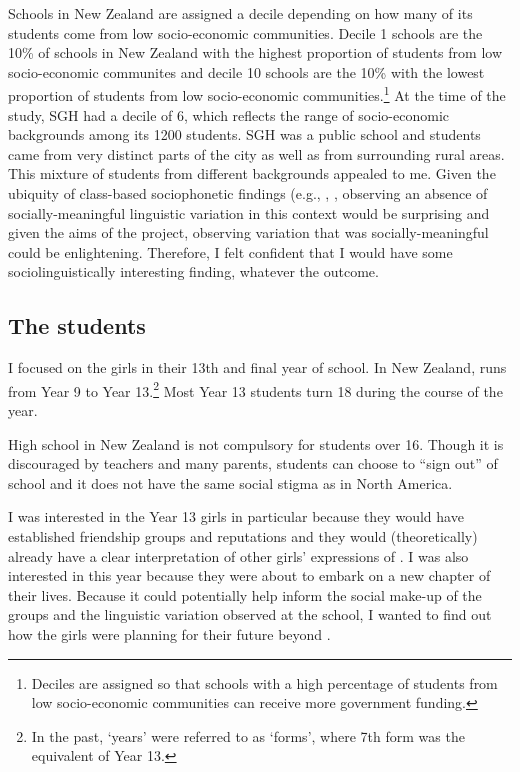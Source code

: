 Schools in New Zealand are assigned a decile depending on how many of its students come from low socio-economic communities. Decile 1 schools are the 10\% of schools in New Zealand with the highest proportion of students from low socio-economic communites and decile 10 schools are the 10\% with the lowest proportion of students from low socio-economic communities.\footnote{Deciles are assigned so that schools with a high percentage of students from low socio-economic communities can receive more government funding.} At the time of the study, SGH had a decile of 6, which reflects the range of socio-economic backgrounds among its 1200 students. SGH was a public school and students came from very distinct parts of the city as well as from surrounding rural areas. This mixture of students from different backgrounds appealed to me. Given the ubiquity of class-based sociophonetic findings (e.g., \citet{labov1966}, \citet{trudgill1972}, observing an absence of socially-meaningful linguistic variation in this context would be surprising and given the aims of the project, observing variation that was socially-meaningful could be enlightening. Therefore, I felt confident that I would have some sociolinguistically interesting finding, whatever the outcome. \nocite{labov1966} \nocite{trudgill1972}


\subsection{The students}
I focused on the girls in their 13th and final year of school. In New Zealand,  runs from Year 9 to Year 13.\footnote{In the past, `years' were referred to as `forms', where 7th form was the equivalent of Year 13.}  Most Year 13 students turn 18 during the course of the year. 

High school in New Zealand is not compulsory for students over 16. Though it is discouraged by teachers and many parents, students can choose to ``sign out'' of school and it does not have the same social stigma as in North America. 

I was interested in the Year 13 girls in particular because they would have established friendship groups and reputations and they would (theoretically) already have a clear interpretation of other girls' expressions of . I was also interested in this year because they were about to embark on a new chapter of their lives. Because it could potentially help inform the social make-up of the groups and the linguistic variation observed at the school, I wanted to find out how the girls were planning for their future beyond .


